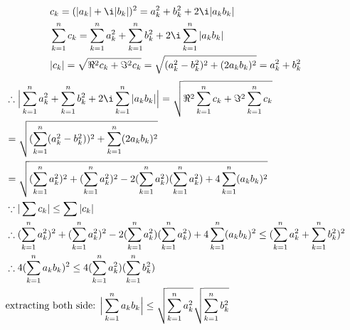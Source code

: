 \begin{solve}
	\begin{align*}
		&c_k = (|a_k| + \i |b_k|)^2 = a_k^2 + b_k^2 + 2\i |a_k b_k|\\
		&\sum_{k=1}^n c_k = \sum_{k=1}^n a_k^2 + \sum_{k=1}^n b_k^2 + 2\i \sum_{k=1}^n |a_k b_k|\\
		&|c_k| = \sqrt{\Re^2 c_k + \Im^2 c_k} = \sqrt{(a_k^2-b_k^2)^2 + (2a_kb_k)^2} = a_k^2+b_k^2
	\end{align*}
	\begin{align*}
		&\therefore \Big| \sum_{k=1}^n a_k^2 + \sum_{k=1}^n b_k^2 + 2\i \sum_{k=1}^n |a_k b_k| \Big|
		= \sqrt{\Re^2 \sum_{k=1}^n c_k + \Im^2 \sum_{k=1}^n c_k}\\
		&= \sqrt{(\sum_{k=1}^n (a_k^2-b_k^2))^2 + \sum_{k=1}^n (2a_kb_k)^2}\\
		&= \sqrt{(\sum_{k=1}^n a_k^2)^2 + (\sum_{k=1}^n a_k^2)^2 - 2(\sum_{k=1}^n a_k^2)(\sum_{k=1}^n a_k^2) + 4\sum_{k=1}^n (a_kb_k)^2}\\	
 		&\because |\sum c_k| \le \sum|c_k| \\
 		&\therefore  (\sum_{k=1}^n a_k^2)^2 + (\sum_{k=1}^n a_k^2)^2 - 2(\sum_{k=1}^n a_k^2)(\sum_{k=1}^n a_k^2) + 4\sum_{k=1}^n (a_kb_k)^2 \le (\sum_{k=1}^n a_k^2 + \sum_{k=1}^n b_k^2)^2\\
 		&\therefore 4(\sum_{k=1}^n a_k b_k)^2 \le 4(\sum_{k=1}^n a_k^2) (\sum_{k=1}^n b_k^2)\\
 		& \text{extracting both side: } \Big|\sum_{k=1}^n a_k b_k\Big| \le \sqrt{\sum_{k=1}^n a_k^2} \sqrt{\sum_{k=1}^n b_k^2}
\end{align*}
\end{solve}

